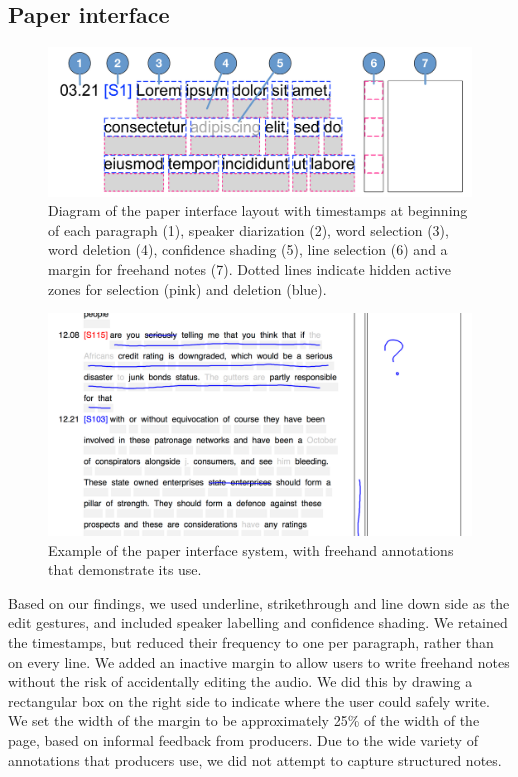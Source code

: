 \subsection{Paper interface}

\begin{figure}[p]
  \centering
  \includegraphics[width=\columnwidth]{figs/paper-interface-diagram.pdf}
  \caption{Diagram of the paper interface layout with timestamps at beginning of each paragraph (1), speaker
    diarization (2), word selection (3), word deletion (4), confidence shading (5), line selection (6) and a margin for
  freehand notes (7). Dotted lines indicate hidden active zones for selection (pink) and deletion (blue).}
  \label{fig:paper-interface-diagram}
\end{figure}

\begin{figure}[p]
  \centering
  \includegraphics[width=\columnwidth]{figs/paper-interface-example-annotations.png}
  \caption{Example of the paper interface system, with freehand annotations that demonstrate its use.}
  \label{fig:paper-interface-example}
\end{figure}

Based on our findings, we used underline, strikethrough and line down side as the edit gestures, and included speaker
labelling and confidence shading.  We retained the timestamps, but reduced their frequency to one per paragraph, rather
than on every line.  We added an inactive margin to allow users to write freehand notes without the risk of
accidentally editing the audio.  We did this by drawing a rectangular box on the right side to indicate where the user
could safely write.  We set the width of the margin to be approximately 25\% of the width of the page, based on
informal feedback from producers.  Due to the wide variety of annotations that producers use, we did not attempt to
capture structured notes.

